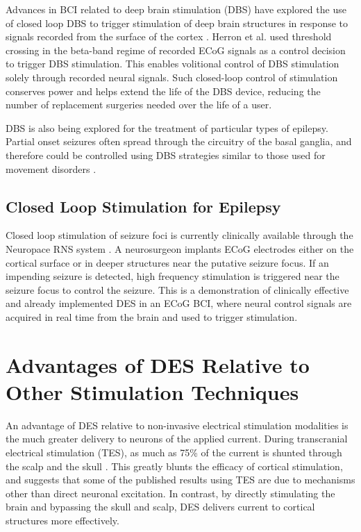 Advances in BCI related to deep brain stimulation (DBS) have explored the use of closed loop DBS to trigger stimulation of deep brain structures in response to signals recorded from the surface of the cortex \cite{Herron2017}. Herron et al. used threshold crossing in the beta-band regime of recorded ECoG signals as a control decision to trigger DBS stimulation. This enables volitional control of DBS stimulation solely through recorded neural signals. Such closed-loop control of stimulation conserves power and helps extend the life of the DBS device, reducing the number of replacement surgeries needed over the life of a user. 

DBS is also being explored for the treatment of particular types of epilepsy. Partial onset seizures often spread through the circuitry of the basal ganglia, and therefore could be controlled using DBS strategies similar to those used for movement disorders \cite{Lega2010,Halpern2008}. 

\subsection{Closed Loop Stimulation for Epilepsy}

Closed loop stimulation of seizure foci is currently clinically available through the Neuropace RNS system \cite{Morrell2011,Lee2015}. A neurosurgeon implants ECoG electrodes either on the cortical surface or in deeper structures near the putative seizure focus. If an impending seizure is detected, high frequency stimulation is triggered near the seizure focus to control the seizure. This is a demonstration of clinically effective and already implemented DES in an ECoG BCI, where neural control signals are acquired in real time from the brain and used to trigger stimulation. 

\section{Advantages of DES Relative to Other Stimulation Techniques}

An advantage of DES relative to non-invasive electrical stimulation modalities is the much greater delivery to neurons of the applied current. During transcranial electrical stimulation (TES), as much as 75\% of the current is shunted through the scalp and the skull \cite{Widge2018,Voroslakos2018}. This greatly blunts the efficacy of cortical stimulation, and suggests that some of the published results using TES are due to mechanisms other than direct neuronal excitation. In contrast, by directly stimulating the brain and bypassing the skull and scalp, DES delivers current to cortical structures more effectively.

